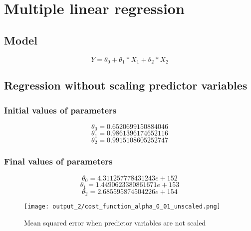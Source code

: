 \section{Multiple linear regression}

\subsection{Model}
\begin{equation}
\label{eq:multiple_linear_regression_model}
Y = \theta_0 + \theta_1 * X_1 + \theta_2 * X_2
\end{equation}

\subsection{Regression without scaling predictor variables}
\subsubsection{Initial values of parameters}
\begin{equation}
\theta_0 = 0.6520699150884046
\end{equation}
\begin{equation}
\theta_1 = 0.9861396174652116
\end{equation}
\begin{equation}
\theta_2 = 0.9915108605252747
\end{equation}

\subsubsection{Final values of parameters}
\begin{equation}
\theta_0 = 4.311257778431243e+152
\end{equation}
\begin{equation}
\theta_1 = 1.4490623380861671e+153
\end{equation}
\begin{equation}
\theta_2 = 2.685595874504226e+154
\end{equation}

\begin{figure}[!ht]
    \texttt{[image: output\_2/cost\_function\_alpha\_0\_01\_unscaled.png]}
    \caption{Mean squared error when predictor variables are not scaled}
    \label{fig:mean_squared_without_scaling}
\end{figure}

